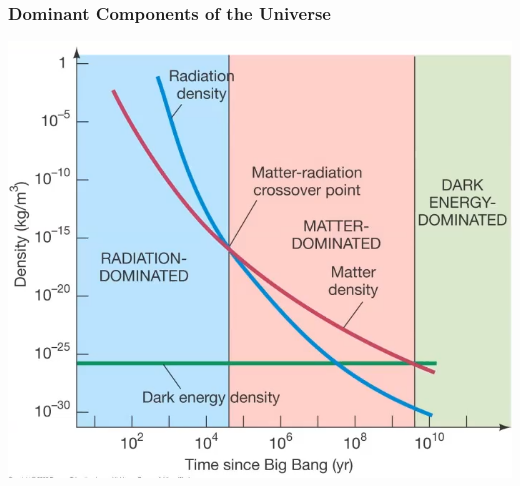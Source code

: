 \documentclass{book}
\begin{document}
\subsubsection{Dominant Components of the Universe}
\begin{center}
    \includegraphics[height = 0.4\textwidth]{images/components.png}
\end{center}
\end{document}
